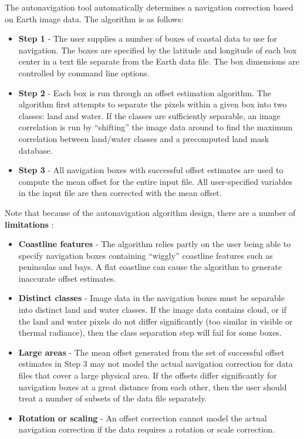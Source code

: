  The autonavigation tool automatically determines a navigation correction based on Earth image data. The algorithm is as follows:
\begin{itemize}
\item \textbf{Step 1}
 - The user supplies a number of boxes of coastal data to use for navigation. The boxes are specified by the latitude and longitude of each box center in a text file separate from the Earth data file. The box dimensions are controlled by command line options.
\item \textbf{Step 2}
 - Each box is run through an offset estimation algorithm. The algorithm first attempts to separate the pixels within a given box into two classes: land and water. If the classes are sufficiently separable, an image correlation is run by ``shifting'' the image data around to find the maximum correlation between land/water classes and a precomputed land mask database.
\item \textbf{Step 3}
 - All navigation boxes with successful offset estimates are used to compute the mean offset for the entire input file. All user-specified variables in the input file are then corrected with the mean offset.

\end{itemize}


 Note that because of the autonavigation algorithm design, there are a number of \textbf{limitations}
:
\begin{itemize}
\item \textbf{Coastline features}
 - The algorithm relies partly on the user being able to specify navigation boxes containing ``wiggly'' coastline features such as peninsulas and bays. A flat coastline can cause the algorithm to generate inaccurate offset estimates.
\item \textbf{Distinct classes}
 - Image data in the navigation boxes must be separable into distinct land and water classes. If the image data contains cloud, or if the land and water pixels do not differ significantly (too similar in visible or thermal radiance), then the class separation step will fail for some boxes.
\item \textbf{Large areas}
 - The mean offset generated from the set of successful offset estimates in Step 3 may not model the actual navigation correction for data files that cover a large physical area. If the offsets differ significantly for navigation boxes at a great distance from each other, then the user should treat a number of subsets of the data file separately.
\item \textbf{Rotation or scaling}
 - An offset correction cannot model the actual navigation correction if the data requires a rotation or scale correction.

\end{itemize}


